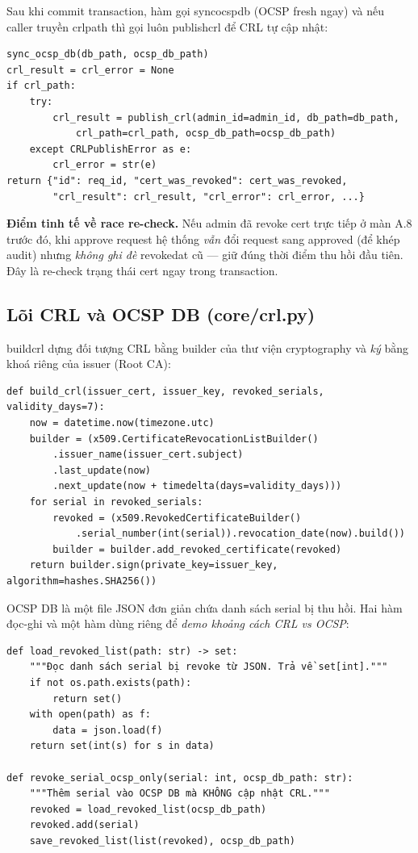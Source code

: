 \documentclass[12pt,a4paper]{article}
\newcommand{\code}[1]{{\ttfamily\small\def\_{\textunderscore\discretionary{}{}{}}#1}}
\begin{document}
Sau khi commit transaction, hàm gọi \code{sync\_ocsp\_db} (OCSP fresh ngay) và
nếu caller truyền \code{crl\_path} thì gọi luôn \code{publish\_crl} để CRL tự
cập nhật:

\begin{Verbatim}
sync_ocsp_db(db_path, ocsp_db_path)
crl_result = crl_error = None
if crl_path:
    try:
        crl_result = publish_crl(admin_id=admin_id, db_path=db_path,
            crl_path=crl_path, ocsp_db_path=ocsp_db_path)
    except CRLPublishError as e:
        crl_error = str(e)
return {"id": req_id, "cert_was_revoked": cert_was_revoked,
        "crl_result": crl_result, "crl_error": crl_error, ...}
\end{Verbatim}

\begin{notebox}
\textbf{Điểm tinh tế về race re-check.} Nếu admin đã revoke cert trực tiếp ở màn
A.8 trước đó, khi approve request hệ thống \emph{vẫn} đổi request sang
\code{approved} (để khép audit) nhưng \emph{không ghi đè} \code{revoked\_at} cũ
--- giữ đúng thời điểm thu hồi đầu tiên. Đây là re-check trạng thái cert ngay
trong transaction.
\end{notebox}

\subsection{Lõi CRL và OCSP DB (core/crl.py)}

\code{build\_crl} dựng đối tượng CRL bằng builder của thư viện
\code{cryptography} và \emph{ký} bằng khoá riêng của issuer (Root CA):

\begin{Verbatim}
def build_crl(issuer_cert, issuer_key, revoked_serials, validity_days=7):
    now = datetime.now(timezone.utc)
    builder = (x509.CertificateRevocationListBuilder()
        .issuer_name(issuer_cert.subject)
        .last_update(now)
        .next_update(now + timedelta(days=validity_days)))
    for serial in revoked_serials:
        revoked = (x509.RevokedCertificateBuilder()
            .serial_number(int(serial)).revocation_date(now).build())
        builder = builder.add_revoked_certificate(revoked)
    return builder.sign(private_key=issuer_key, algorithm=hashes.SHA256())
\end{Verbatim}

OCSP DB là một file JSON đơn giản chứa danh sách serial bị thu hồi. Hai hàm
đọc-ghi và một hàm dùng riêng để \emph{demo khoảng cách CRL vs OCSP}:

\begin{Verbatim}
def load_revoked_list(path: str) -> set:
    """Đọc danh sách serial bị revoke từ JSON. Trả về set[int]."""
    if not os.path.exists(path):
        return set()
    with open(path) as f:
        data = json.load(f)
    return set(int(s) for s in data)

def revoke_serial_ocsp_only(serial: int, ocsp_db_path: str):
    """Thêm serial vào OCSP DB mà KHÔNG cập nhật CRL."""
    revoked = load_revoked_list(ocsp_db_path)
    revoked.add(serial)
    save_revoked_list(list(revoked), ocsp_db_path)
\end{Verbatim}
\end{document}
